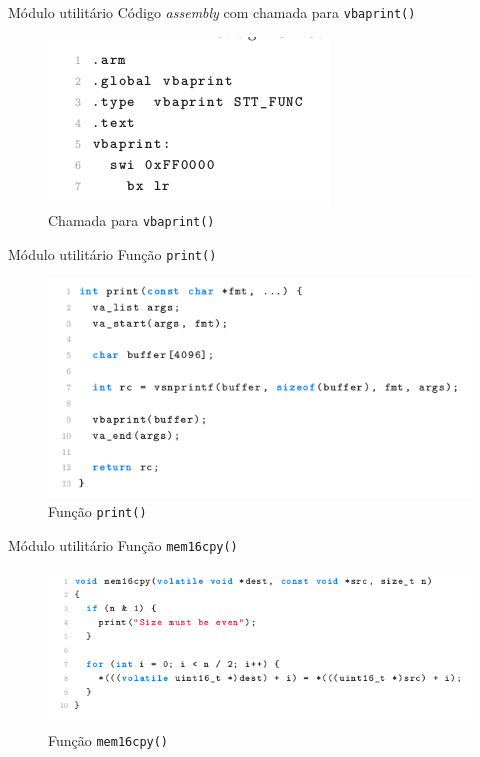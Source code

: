 \documentclass[notes, mathserif]{beamer}
\begin{document}
\begin{frame}{M\'odulo utilit\'ario}
	C\'odigo \textit{assembly} com chamada para \texttt{vbaprint()}
	\begin{figure}[H]
		\includegraphics[width=.4\linewidth]{figuras/print_asm.png}
		\centering
		\caption{Chamada para \texttt{vbaprint()}}
		\label{fig:vbaprint}
	\end{figure}
\end{frame}


\begin{frame}{M\'odulo utilit\'ario}
	Fun\c c\~ao \texttt{print()}
	\begin{figure}[H]
		\includegraphics[width=.7\linewidth]{figuras/print.png}
		\centering
		\caption{Fun\c c\~ao \texttt{print()}}
		\label{fig:print}
	\end{figure}
\end{frame}

\begin{frame}{M\'odulo utilit\'ario}
	Fun\c c\~ao \texttt{mem16cpy()}
	\begin{figure}[H]
		\includegraphics[width=.7\linewidth]{figuras/mem16cpy.png}
		\centering
		\caption{Fun\c c\~ao \texttt{mem16cpy()}}
		\label{fig:mem16cpy}
	\end{figure}
\end{frame}
\end{document}
